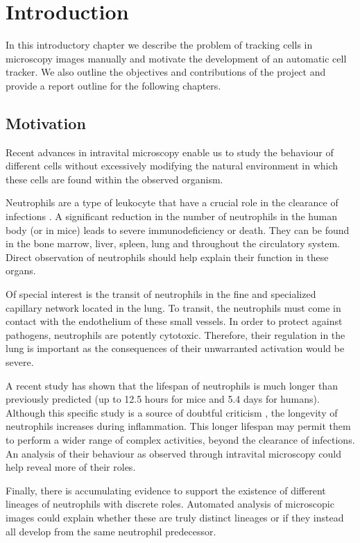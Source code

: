 	\chapter{Introduction}


	In this introductory chapter we describe the problem of tracking cells in microscopy images manually and motivate the development of an automatic cell tracker. We also outline the objectives and contributions of the project and provide a report outline for the following chapters.
	
	\section{Motivation}
		
		Recent advances in intravital microscopy enable us to study the behaviour of different cells without excessively modifying the natural environment in which these cells are found within the observed organism. 
			
		Neutrophils are a type of leukocyte that have a crucial role in the clearance of infections \cite{kolku13}. A significant reduction in the number of neutrophils in the human body (or in mice) leads to severe immunodeficiency or death. They can be found in the bone marrow, liver, spleen, lung and throughout the circulatory system. Direct observation of neutrophils should help explain their function in these organs. 
		
		Of special interest is the transit of neutrophils in the fine and specialized capillary network located in the lung. To transit, the neutrophils must come in contact with the endothelium of these small vessels. In order to protect against pathogens, neutrophils are potently cytotoxic. Therefore, their regulation in the lung is important as the consequences of their unwarranted activation would be severe.
		
		A recent study \cite{pillay10} has shown that the lifespan of neutrophils is much longer than previously predicted (up to 12.5 hours for mice and 5.4 days for humans). Although this specific study is a source of doubtful criticism \cite{toft11}, the longevity of neutrophils increases during inflammation. This longer lifespan may permit them to perform a wider range of complex activities, beyond the clearance of infections. An analysis of their behaviour as observed through intravital microscopy could help reveal more of their roles.
		
		Finally, there is accumulating evidence to support the existence of different lineages of neutrophils with discrete roles. Automated analysis of microscopic images could explain whether these are truly distinct lineages or if they instead all develop from the same neutrophil predecessor.
		
